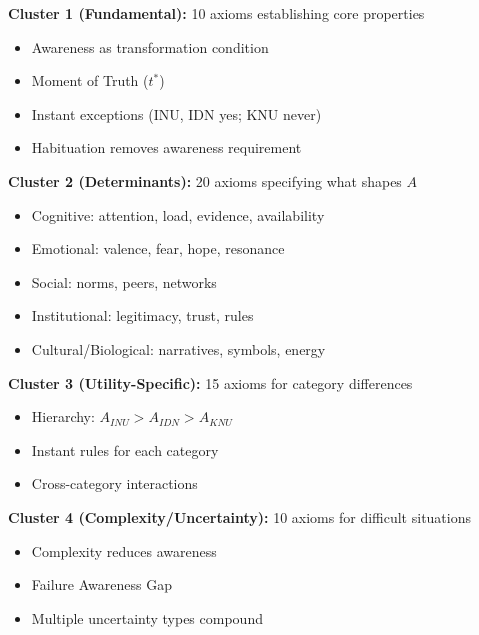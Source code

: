 \begin{tcolorbox}[colback=gray!5!white, colframe=gray!75!black, title=Axiom Clusters 1--4 Summary]

\textbf{Cluster 1 (Fundamental):} 10 axioms establishing core properties
\begin{itemize}
\item Awareness as transformation condition
\item Moment of Truth ($t^*$)
\item Instant exceptions (INU, IDN yes; KNU never)
\item Habituation removes awareness requirement
\end{itemize}

\textbf{Cluster 2 (Determinants):} 20 axioms specifying what shapes $A$
\begin{itemize}
\item Cognitive: attention, load, evidence, availability
\item Emotional: valence, fear, hope, resonance
\item Social: norms, peers, networks
\item Institutional: legitimacy, trust, rules
\item Cultural/Biological: narratives, symbols, energy
\end{itemize}

\textbf{Cluster 3 (Utility-Specific):} 15 axioms for category differences
\begin{itemize}
\item Hierarchy: $A_{INU} > A_{IDN} > A_{KNU}$
\item Instant rules for each category
\item Cross-category interactions
\end{itemize}

\textbf{Cluster 4 (Complexity/Uncertainty):} 10 axioms for difficult situations
\begin{itemize}
\item Complexity reduces awareness
\item Failure Awareness Gap
\item Multiple uncertainty types compound
\end{itemize}

\end{tcolorbox}

